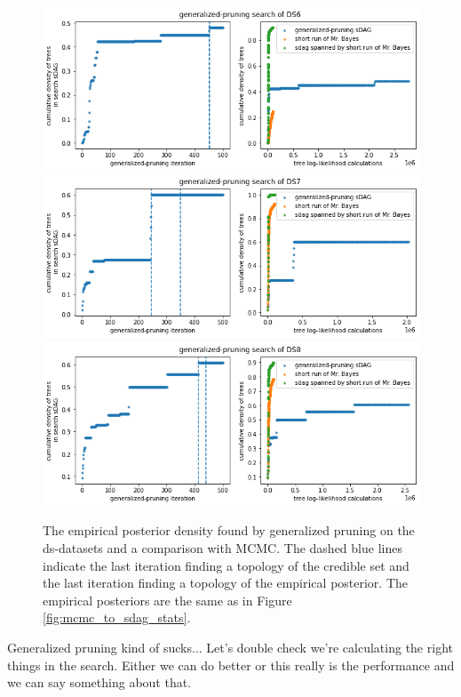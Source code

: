 \documentclass{article}
\begin{document}
\begin{figure}[!t]\centering
\includegraphics[scale=0.4]{figures/gp_ds6_pp.png}
\includegraphics[scale=0.4]{figures/gp_ds7_pp.png}
\includegraphics[scale=0.4]{figures/gp_ds8_pp.png}
\caption{The empirical posterior density found by generalized pruning on the ds-datasets and a comparison with MCMC.
The dashed blue lines indicate the last iteration finding a topology of the credible set and the last iteration finding a topology of the empirical posterior. 
The empirical posteriors are the same as in Figure \ref{fig:mcmc_to_sdag_stats}.}
\label{fig:generalizedPruningFoundPosterior}
\end{figure}

\vspace{8ex}
Generalized pruning kind of sucks... 
Let's double check we're calculating the right things in the search.
Either we can do better or this really is the performance and we can say something about that.
\end{document}
